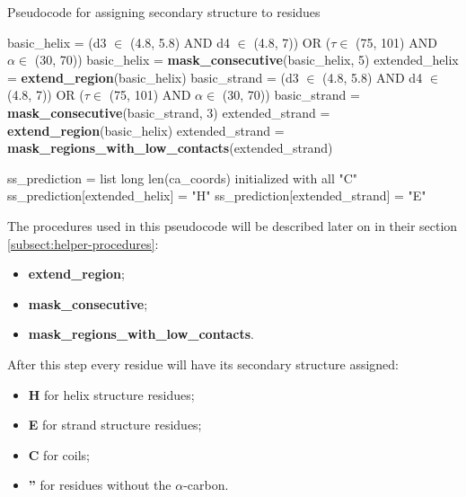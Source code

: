 \begin{algorithm}[ht]
    \caption{Pseudocode for assigning secondary structure to residues}\label{alg:two}
    \begin{algorithmic}

        \STATE basic\_helix = (d3 $\in$ (4.8, 5.8) AND d4 $\in$ (4.8, 7)) OR ($\tau \in$  (75, 101) AND $\alpha \in$ (30, 70))
        \STATE basic\_helix = \textbf{mask\_consecutive}(basic\_helix, 5)
        \STATE extended\_helix = \textbf{extend\_region}(basic\_helix)
        \STATE basic\_strand = (d3 $\in$ (4.8, 5.8) AND d4 $\in$ (4.8, 7)) OR ($\tau \in$  (75, 101) AND $\alpha \in$ (30, 70))
        \STATE basic\_strand = \textbf{mask\_consecutive}(basic\_strand, 3)
        \STATE extended\_strand = \textbf{extend\_region}(basic\_helix)
        \STATE extended\_strand = \textbf{mask\_regions\_with\_low\_contacts}(extended\_strand)

        \STATE ss\_prediction = list long len(ca\_coords) initialized with all "C"
        \STATE ss\_prediction[extended\_helix] = "H"
        \STATE ss\_prediction[extended\_strand] = "E"

    \end{algorithmic}
\end{algorithm}

\pagebreak

The procedures used in this pseudocode will be described later on in their section \ref{subsect:helper-procedures}:
\begin{itemize}
    \item \textbf{extend\_region};
    \item \textbf{mask\_consecutive};
    \item \textbf{mask\_regions\_with\_low\_contacts}.
\end{itemize}

After this step every residue will have its secondary structure assigned:
\begin{itemize}
    \item \textbf{H} for helix structure residues;
    \item \textbf{E} for strand structure residues;
    \item \textbf{C} for coils;
    \item \textbf{''} for residues without the $\alpha$-carbon.
\end{itemize}

